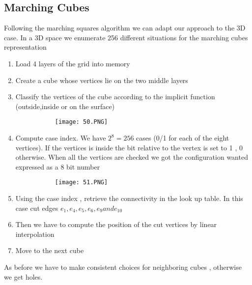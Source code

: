 \documentclass{article}
\begin{document}
\vspace{30mm}

\subsection{Marching Cubes}

Following the marching squares algorithm we can adapt our approach to the 3D case. In a 3D space we enumerate 256 different situations for the marching cubes representation

\begin{enumerate}
    \item Load 4 layers of the grid into memory
    \item Create a cube whose vertices lie on the two middle layers
    \item Classify the vertices of the cube according to the implicit function (outside,inside or on the surface)

    \begin{figure}[ht!]
  \centering
  \begin{subfigure}[b]{0.4\linewidth}
    \texttt{[image: 50.PNG]}
  \end{subfigure}
\end{figure}

\item Compute case index. We have $2^8 = 256 $ cases (0/1 for each of the eight vertices). If the vertices is inside the bit relative to the vertex is set to 1 , 0 otherwise. When all the vertices are checked we got the configuration wanted expressed as a 8 bit number

    \begin{figure}[ht!]
  \centering
  \begin{subfigure}[b]{0.8\linewidth}
    \texttt{[image: 51.PNG]}
  \end{subfigure}
\end{figure}

\item Using the case index , retrieve the connectivity in the look up table. In this case cut edges $e_1,e_4,e_5,e_6,e_9 and e_10$

\item Then we have to compute the position of the cut vertices by linear interpolation
\item Move to the next cube

\end{enumerate}

As before we have to make consistent choices for neighboring cubes , otherwise we get holes.
\end{document}
